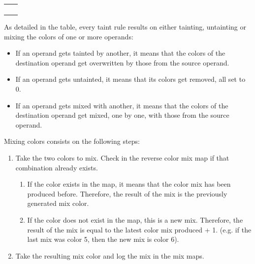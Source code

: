 \documentclass[conference]{IEEEtran}
\begin{document}
\begin{table}[htbp]
\begin{center}
\begin{tabular}{|>{\centering\arraybackslash}p{2cm}|>{\centering\arraybackslash}p{5.5cm}|}
                                      &                     \\
                                      &                     \\
                                      &                     \\
                                      &                     \\
            \hline
        \end{tabular}
        \label{tab1}
    \end{center}
    \label{table:taint_rules}
\end{table}

As detailed in the table, every taint rule results on either tainting,
untainting or mixing the colors of one or more operands:
\begin{itemize}
    \item If an operand gets tainted by another, it means that the colors of the
          destination operand get overwritten by those from the source operand.
    \item If an operand gets untainted, it means that its colors get removed, all set to
          0.
    \item If an operand gets mixed with another, it means that the colors of the
          destination operand get mixed, one by one, with those from the source operand.
\end{itemize}

Mixing colors consists on the following steps:
\begin{enumerate}
    \item Take the two colors to mix. Check in the reverse color mix map if that
          combination already exists.
          \begin{enumerate}
              \item If the color exists in the map, it means that the color mix has been produced
                    before. Therefore, the result of the mix is the previously generated mix color.
              \item If the color does not exist in the map, this is a new mix. Therefore, the
                    result of the mix is equal to the latest color mix produced + 1. (e.g. if the
                    last mix was color 5, then the new mix is color 6).
          \end{enumerate}
    \item Take the resulting mix color and log the mix in the mix maps.
\end{enumerate}
\end{document}
